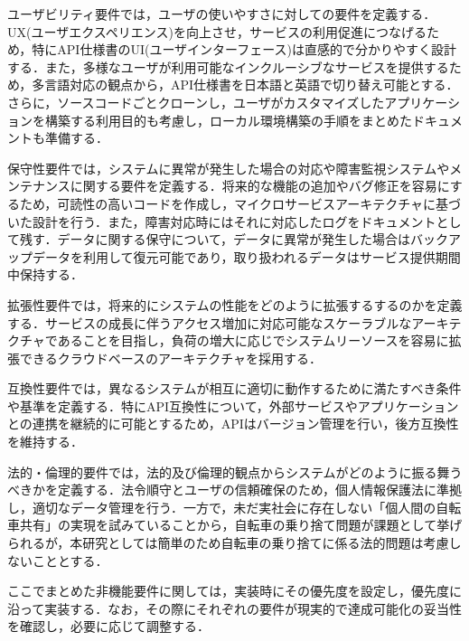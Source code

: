           \par ユーザビリティ要件では，ユーザの使いやすさに対しての要件を定義する．UX(ユーザエクスペリエンス)を向上させ，サービスの利用促進につなげるため，特にAPI仕様書のUI(ユーザインターフェース)は直感的で分かりやすく設計する．また，多様なユーザが利用可能なインクルーシブなサービスを提供するため，多言語対応の観点から，API仕様書を日本語と英語で切り替え可能とする．さらに，ソースコードごとクローンし，ユーザがカスタマイズしたアプリケーションを構築する利用目的も考慮し，ローカル環境構築の手順をまとめたドキュメントも準備する．
          \par 保守性要件では，システムに異常が発生した場合の対応や障害監視システムやメンテナンスに関する要件を定義する．将来的な機能の追加やバグ修正を容易にするため，可読性の高いコードを作成し，マイクロサービスアーキテクチャに基づいた設計を行う．また，障害対応時にはそれに対応したログをドキュメントとして残す．データに関する保守について，データに異常が発生した場合はバックアップデータを利用して復元可能であり，取り扱われるデータはサービス提供期間中保持する．
          \par 拡張性要件では，将来的にシステムの性能をどのように拡張するするのかを定義する．サービスの成長に伴うアクセス増加に対応可能なスケーラブルなアーキテクチャであることを目指し，負荷の増大に応じでシステムリーソースを容易に拡張できるクラウドベースのアーキテクチャを採用する．
          \par 互換性要件では，異なるシステムが相互に適切に動作するために満たすべき条件や基準を定義する．特にAPI互換性について，外部サービスやアプリケーションとの連携を継続的に可能とするため，APIはバージョン管理を行い，後方互換性を維持する．
          \par 法的・倫理的要件では，法的及び倫理的観点からシステムがどのように振る舞うべきかを定義する．法令順守とユーザの信頼確保のため，個人情報保護法に準拠し，適切なデータ管理を行う．一方で，未だ実社会に存在しない「個人間の自転車共有」の実現を試みていることから，自転車の乗り捨て問題が課題として挙げられるが，本研究としては簡単のため自転車の乗り捨てに係る法的問題は考慮しないこととする．
          \par ここでまとめた非機能要件に関しては，実装時にその優先度を設定し，優先度に沿って実装する．なお，その際にそれぞれの要件が現実的で達成可能化の妥当性を確認し，必要に応じて調整する．
      
